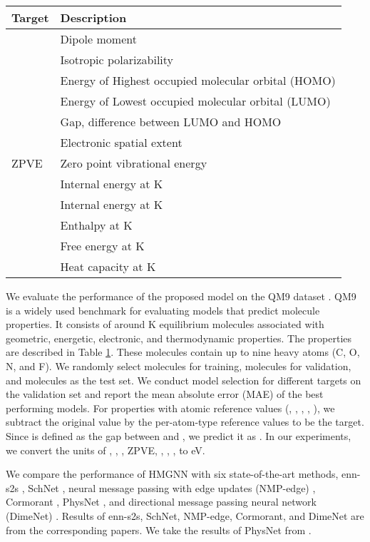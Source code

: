 \documentclass[conference]{IEEEtran}
\begin{document}
\begin{table}[t]
\begin{center}
\begin{tabular}{l|l}
\toprule
Target & Description \\
\midrule
 & Dipole moment \\
 & Isotropic polarizability \\
 & Energy of Highest occupied molecular orbital (HOMO) \\
 & Energy of Lowest occupied molecular orbital (LUMO) \\
 & Gap, difference between LUMO and HOMO \\
 & Electronic spatial extent \\
ZPVE & Zero point vibrational energy \\
 & Internal energy at  K \\
 & Internal energy at  K \\
 & Enthalpy at  K \\
 & Free energy at  K \\
 & Heat capacity at  K \\
\bottomrule
\end{tabular}
\label{Table:Property}
\end{center}
\end{table}

We evaluate the performance of the proposed model on the QM9 dataset \cite{QM9-1, QM9-2}. QM9 is a widely used benchmark for evaluating models that predict molecule properties. It consists of around K equilibrium molecules associated with  geometric, energetic, electronic, and thermodynamic properties. The properties are described in Table \ref{Table:Property}. These molecules contain up to nine heavy atoms (C, O, N, and F). We randomly select  molecules for training,  molecules for validation, and  molecules as the test set. We conduct model selection for different targets on the validation set and report the mean absolute error (MAE) of the best performing models. For properties with atomic reference values (, , , , ), we subtract the original value by the per-atom-type reference values to be the target. Since  is defined as the gap between  and , we predict it as . In our experiments, we convert the units of , , , ZPVE, , , ,  to eV.

We compare the performance of HMGNN with six state-of-the-art methods, enn-s2s \cite{MPNN}, SchNet \cite{SchNet-1}, neural message passing with edge updates (NMP-edge) \cite{NMP-edge}, Cormorant \cite{anderson2019cormorant}, PhysNet \cite{unke2019physnet}, and directional message passing neural network (DimeNet) \cite{DimeNet}. Results of enn-s2s, SchNet, NMP-edge, Cormorant, and DimeNet are from the corresponding papers. We take the results of PhysNet from \cite{DimeNet}.
\end{document}
